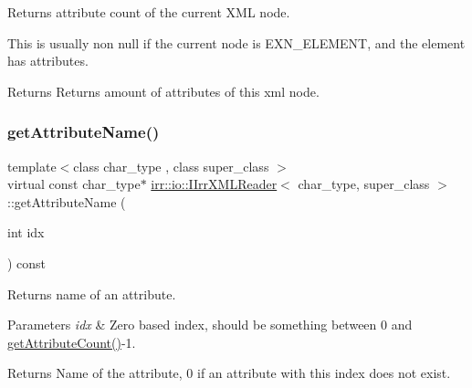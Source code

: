 Returns attribute count of the current X\+ML node. 

This is usually non null if the current node is E\+X\+N\+\_\+\+E\+L\+E\+M\+E\+NT, and the element has attributes. \begin{DoxyReturn}{Returns}
Returns amount of attributes of this xml node. 
\end{DoxyReturn}
\mbox{\label{classirr_1_1io_1_1IIrrXMLReader_aa0807dc565c67fcf355e656df1a326ef}} 
\subsubsection{\texorpdfstring{get\+Attribute\+Name()}{getAttributeName()}\hspace{0.1cm}{\footnotesize\ttfamily [1/2]}}
{\footnotesize\ttfamily template$<$class char\+\_\+type , class super\+\_\+class $>$ \\
virtual const char\+\_\+type$\ast$ \hyperlink{classirr_1_1io_1_1IIrrXMLReader}{irr\+::io\+::\+I\+Irr\+X\+M\+L\+Reader}$<$ char\+\_\+type, super\+\_\+class $>$\+::get\+Attribute\+Name (\begin{DoxyParamCaption}\item[{int}]{idx }\end{DoxyParamCaption}) const\hspace{0.3cm}{\ttfamily [pure virtual]}}



Returns name of an attribute. 


\begin{DoxyParams}{Parameters}
{\em idx} & Zero based index, should be something between 0 and \hyperlink{classirr_1_1io_1_1IIrrXMLReader_a8f85253d2efb15061facdb9571b9c549}{get\+Attribute\+Count()}-\/1. \\
\hline
\end{DoxyParams}
\begin{DoxyReturn}{Returns}
Name of the attribute, 0 if an attribute with this index does not exist. 
\end{DoxyReturn}
\mbox{\label{classirr_1_1io_1_1IIrrXMLReader_aa0807dc565c67fcf355e656df1a326ef}} 
